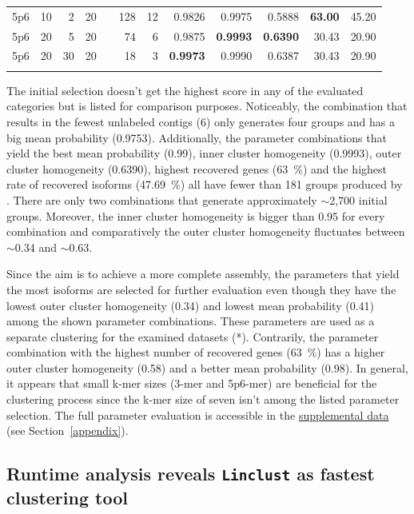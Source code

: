 \documentclass[12pt,a4paper,english]{article}
\begin{document}
\begin{table}[H]
{\begin{tabular}{rrrrrrrrrrrr}
				5p6 & 10 & 2 & 20 &  & 128 & 12 & 0.9826 & 0.9975 & 0.5888 & \textbf{63.00} & 45.20 \\ \addlinespace
				5p6 & 20 & 5 & 20 &  & 74 & 6 & 0.9875 & \textbf{0.9993} & \textbf{0.6390} & 30.43 & 20.90 \\ \addlinespace
				5p6 & 20 & 30 & 20 &  & 18 & 3 & \textbf{0.9973} & 0.9990 & 0.6387 & 30.43 & 20.90 \\ \addlinespace
				\bottomrule
			\end{tabular}%
		}
	\end{table}
	
    The initial selection doesn't get the highest score in any of the evaluated categories but is listed for comparison purposes.
	Noticeably, the combination that results in the fewest unlabeled contigs (6) only generates four groups and has a big mean probability (0.9753). Additionally, the parameter combinations that yield the best mean probability (0.99), inner cluster homogeneity (0.9993), outer cluster homogeneity (0.6390), highest recovered genes (63~\%) and the highest rate of recovered isoforms (47.69~\%) all have fewer than 181 groups produced by \hdbscan. There are only two combinations that generate approximately $\sim$2,700 initial groups. Moreover, the inner cluster homogeneity is bigger than 0.95 for every combination and comparatively the outer cluster homogeneity fluctuates between $\sim$0.34 and $\sim$0.63.
	
	Since the aim is to achieve a more complete assembly, the parameters that yield the most isoforms are selected for further evaluation even though they have the lowest outer cluster homogeneity (0.34) and lowest mean probability (0.41) among the shown parameter combinations. These parameters are used as a separate clustering for the examined datasets (\karma{}*).
	Contrarily, the parameter combination with the highest number of recovered genes (63~\%) has a higher outer cluster homogeneity (0.58) and a better mean probability (0.98).
	In general, it appears that small k-mer sizes (3-mer and 5p6-mer) are beneficial for the clustering process since the k-mer size of seven isn't among the listed parameter selection.
	The full parameter evaluation is accessible in the \href{https://github.com/lmfaber/master_thesis/tree/master/supplemental_data/parameter_evaluation}{supplemental data} (see Section~\ref{appendix}).


	\subsection{Runtime analysis reveals \texttt{Linclust} as fastest clustering tool}
		
\end{document}
